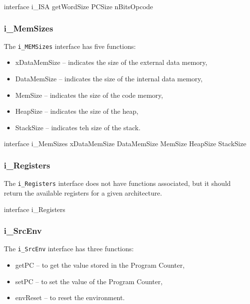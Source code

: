 \documentclass[11pt]{report}
\begin{document}
			\begin{EL}
			interface i_ISA {
				getWordSize	
				PCSize
				nBitsOpcode
			}
			\end{EL} 
			
			\subsubsection*{i\_MemSizes}	
			
			\par The \texttt{i\_MEMSizes} interface has five functions:
			\begin{itemize}
				\item xDataMemSize -- indicates the size of the external data memory,
				\item DataMemSize -- indicates the size of the internal data memory,
				\item MemSize -- indicates the size of the code memory,
				\item HeapSize -- indicates the size of the heap,
				\item StackSize -- indicates teh size of the stack.
			\end{itemize}
			
			\begin{EL}
			interface i_MemSizes{
				xDataMemSize 	
				DataMemSize 	
				MemSize			
				HeapSize			
				StackSize		
			}
			\end{EL} 	

			\subsubsection*{i\_Registers}
			
			\par The \texttt{i\_Registers} interface does not have functions associated, but it should return the available registers for a given architecture.
			
			\begin{EL}
			interface i_Registers {
			}
			\end{EL}
			
			\subsubsection*{i\_SrcEnv}	
			
			\par The \texttt{i\_SrcEnv} interface has three functions:
			\begin{itemize}
				\item getPC -- to get the value stored in the Program Counter,
				\item setPC -- to set the value of the Program Counter,
				\item envReset -- to reset the environment.
			\end{itemize}
			
\end{document}
